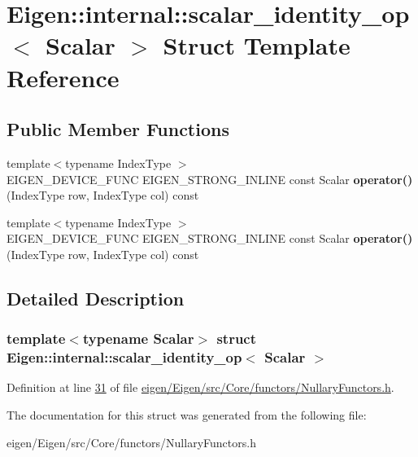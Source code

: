 \hypertarget{struct_eigen_1_1internal_1_1scalar__identity__op}{}\section{Eigen\+:\+:internal\+:\+:scalar\+\_\+identity\+\_\+op$<$ Scalar $>$ Struct Template Reference}
\label{struct_eigen_1_1internal_1_1scalar__identity__op}
\subsection*{Public Member Functions}
\begin{DoxyCompactItemize}
\item 
\mbox{\label{struct_eigen_1_1internal_1_1scalar__identity__op_a8bb3bb0bc9356e0fd655e3ab4e622480}} 
{\footnotesize template$<$typename Index\+Type $>$ }\\E\+I\+G\+E\+N\+\_\+\+D\+E\+V\+I\+C\+E\+\_\+\+F\+U\+NC E\+I\+G\+E\+N\+\_\+\+S\+T\+R\+O\+N\+G\+\_\+\+I\+N\+L\+I\+NE const Scalar {\bfseries operator()} (Index\+Type row, Index\+Type col) const
\item 
\mbox{\label{struct_eigen_1_1internal_1_1scalar__identity__op_a8bb3bb0bc9356e0fd655e3ab4e622480}} 
{\footnotesize template$<$typename Index\+Type $>$ }\\E\+I\+G\+E\+N\+\_\+\+D\+E\+V\+I\+C\+E\+\_\+\+F\+U\+NC E\+I\+G\+E\+N\+\_\+\+S\+T\+R\+O\+N\+G\+\_\+\+I\+N\+L\+I\+NE const Scalar {\bfseries operator()} (Index\+Type row, Index\+Type col) const
\end{DoxyCompactItemize}


\subsection{Detailed Description}
\subsubsection*{template$<$typename Scalar$>$\newline
struct Eigen\+::internal\+::scalar\+\_\+identity\+\_\+op$<$ Scalar $>$}



Definition at line \hyperlink{eigen_2_eigen_2src_2_core_2functors_2_nullary_functors_8h_source_l00031}{31} of file \hyperlink{eigen_2_eigen_2src_2_core_2functors_2_nullary_functors_8h_source}{eigen/\+Eigen/src/\+Core/functors/\+Nullary\+Functors.\+h}.



The documentation for this struct was generated from the following file\+:\begin{DoxyCompactItemize}
\item 
eigen/\+Eigen/src/\+Core/functors/\+Nullary\+Functors.\+h\end{DoxyCompactItemize}

